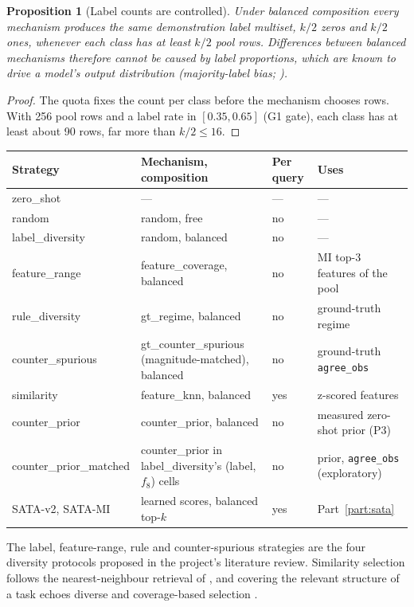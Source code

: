 \documentclass[11pt,a4paper]{article}
\newcommand{\1}{\mathbf{1}}
\theoremstyle{plain}
\newtheorem{proposition}[theorem]{Proposition}
\theoremstyle{definition}
\theoremstyle{remark}
\begin{document}
\begin{proposition}[Label counts are controlled]
\label{prop:balanced}
Under balanced composition every mechanism produces the same demonstration
label multiset, $k/2$ zeros and $k/2$ ones, whenever each class has at
least $k/2$ pool rows. Differences between balanced mechanisms therefore
cannot be caused by label proportions, which are known to drive a model's
output distribution (majority-label bias;
\citealp{zhao2021calibrate,min2022rethinking}).
\end{proposition}
\begin{proof}
The quota fixes the count per class before the mechanism chooses rows.
With 256 pool rows and a label rate in $[0.35, 0.65]$ (G1 gate), each class
has at least about 90 rows, far more than $k/2 \leq 16$.
\end{proof}

\begin{center}
{\small
\begin{tabular}{L{2.9cm}L{5.2cm}L{1.9cm}L{4.9cm}}
\toprule
\textbf{Strategy} & \textbf{Mechanism, composition} & \textbf{Per query} & \textbf{Uses} \\
\midrule
zero\_shot       & --- & --- & --- \\
random           & random, free & no & --- \\
label\_diversity & random, balanced & no & --- \\
feature\_range   & feature\_coverage, balanced & no & MI top-3 features of the pool \\
rule\_diversity  & gt\_regime, balanced & no & ground-truth regime \\
counter\_spurious & gt\_counter\_spurious (magnitude-matched), balanced & no & ground-truth \texttt{agree\_obs} \\
similarity       & feature\_knn, balanced & yes & z-scored features \\
counter\_prior   & counter\_prior, balanced & no & measured zero-shot prior (P3) \\
counter\_prior\_\allowbreak matched & counter\_prior in label\_diversity's (label, $f_8$) cells & no & prior, \texttt{agree\_obs} (exploratory) \\
SATA-v2, SATA-MI & learned scores, balanced top-$k$ & yes & Part~\ref{part:sata} \\
\bottomrule
\end{tabular}}
\end{center}

The label, feature-range, rule and counter-spurious strategies are the four
diversity protocols proposed in the project's literature review. Similarity
selection follows the nearest-neighbour retrieval of \citet{liu2022what},
and covering the relevant structure of a task echoes diverse and
coverage-based selection \citep{levy2023diverse,gupta2023coverage}.
\end{document}
